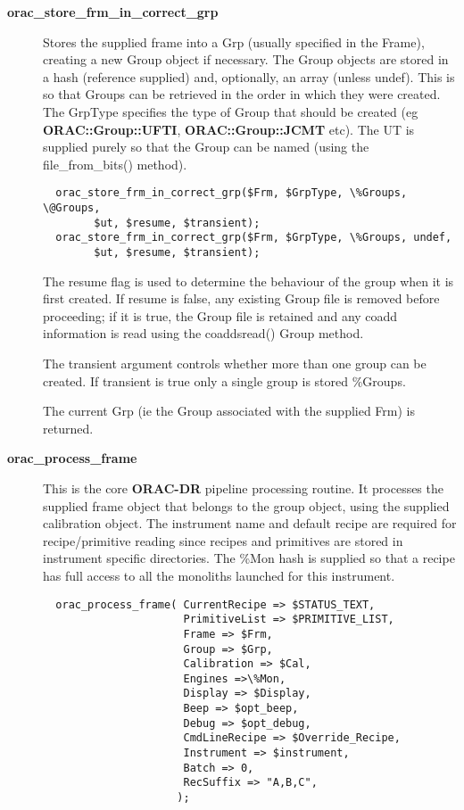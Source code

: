 \begin{description}

\item[{\textbf{orac\_store\_frm\_in\_correct\_grp}}] \mbox{}

Stores the supplied frame into a Grp (usually specified in the Frame),
creating a new Group object if necessary. The Group objects are stored
in a hash (reference supplied) and, optionally, an array (unless undef).
This is so that Groups can be retrieved in the order in which they
were created. The GrpType specifies the type of Group that should be
created (eg \textbf{ORAC::Group::UFTI}, \textbf{ORAC::Group::JCMT} etc). The UT
is supplied purely so that the Group can be named (using the 
file\_from\_bits() method).

\begin{verbatim}
  orac_store_frm_in_correct_grp($Frm, $GrpType, \%Groups, \@Groups,
        $ut, $resume, $transient);
  orac_store_frm_in_correct_grp($Frm, $GrpType, \%Groups, undef, 
        $ut, $resume, $transient);
\end{verbatim}


The resume flag is used to determine the behaviour of the group when
it is first created. If resume is false, any existing Group file is 
removed before proceeding; if it is true, the Group file is retained
and any coadd information is read using the coaddsread() Group
method.



The transient argument controls whether more than one group can be
created. If transient is true only a single group is stored \%Groups.



The current Grp (ie the Group associated with the supplied Frm)
is returned.


\item[{\textbf{orac\_process\_frame}}] \mbox{}

This is the core \textbf{ORAC-DR} pipeline processing routine.
It processes the supplied frame object that belongs to the group object,
using the supplied calibration object. The instrument name and default
recipe are required for recipe/primitive reading since recipes and
primitives are stored in instrument specific directories.
The \%Mon hash is supplied so that a recipe has full access to
all the monoliths launched for this instrument.

\begin{verbatim}
  orac_process_frame( CurrentRecipe => $STATUS_TEXT,
                      PrimitiveList => $PRIMITIVE_LIST,
                      Frame => $Frm,
                      Group => $Grp,
                      Calibration => $Cal,
                      Engines =>\%Mon,
                      Display => $Display,
                      Beep => $opt_beep,
                      Debug => $opt_debug,
                      CmdLineRecipe => $Override_Recipe,
                      Instrument => $instrument,
                      Batch => 0,
                      RecSuffix => "A,B,C",
                     );
\end{verbatim}



\end{description}
